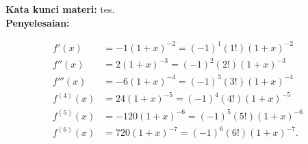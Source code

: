 \documentclass[10pt,openany,a4paper]{article}
\theoremstyle{definition}
\theoremstyle{definition}
\theoremstyle{plain}
\newenvironment{jawab}[2][tes]{
\textbf{Kata kunci materi:} #1.\\
\textbf{Penyelesaian:} #2
}{}
\begin{document}
\begin{enumerate}
\begin{jawab}
{\begin{enumerate}
                        \allowdisplaybreaks
                        \begin{align*}
                            f'(x) &= -1(1+x)^{-2} = (-1)^1(1!)(1+x)^{-2} \\
                            f''(x) &= 2(1+x)^{-3} = (-1)^2(2!)(1+x)^{-3} \\
                            f'''(x) &= -6(1+x)^{-4} = (-1)^3(3!)(1+x)^{-4} \\
                            f^{(4)}(x) &= 24(1+x)^{-5} = (-1)^4(4!)(1+x)^{-5} \\
                            f^{(5)}(x) &= -120(1+x)^{-6} = (-1)^5(5!)(1+x)^{-6} \\
                            f^{(6)}(x) &= 720(1+x)^{-7} = (-1)^6(6!)(1+x)^{-7}.
                        \end{align*}
                    

\end{enumerate}}
\end{jawab}
\end{enumerate}
\end{document}
